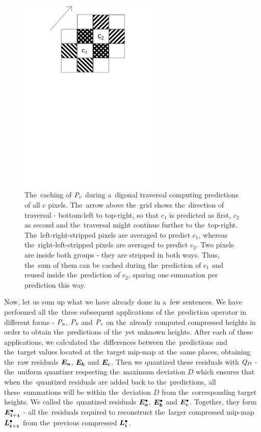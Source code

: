 \begin{figure}
	\includegraphics[trim={0 18cm 1cm 0cm}, clip, width=0.6\textwidth]{figures/ccaching.pdf}\centering
	\caption{The~caching of $\mathit{P_{c}}$ during a~digonal traversal computing predictions of all $c$ pixels. The~arrow above the~grid shows the~direction of traversal - bottom-left to top-right, so that $c_1$ is predicted as first, $c_2$ as second and the~traversal might continue further to the~top-right. The~left-right-stripped pixels are averaged to predict $c_1$, whereas the~right-left-stripped pixels are averaged to predict $c_2$. Two pixels are inside both groups - they are stripped in both ways. Thus, the~sum of them can be cached during the~prediction of $c_1$ and reused inside the~prediction of $c_2$, sparing one summation per prediction this way.}
	\label{fig:ccaching}
\end{figure}

Now, let us sum up what we have already done in a~few sentences. We have performed all the~three subsequent applications of the~prediction operator in different forms - $\mathit{P_{a}}$, $\mathit{P_{b}}$ and $\mathit{P_{c}}$ on the~already computed compressed heights in order to obtain the~predictions of the~yet unknown heights. After each of these applications, we calculated the~differences between the~predictions and the~target values located at the~target mip-map at the~same places, obtaining the~raw residuals $\objnorm{E}{a}$, $\objnorm{E}{b}$ and $\objnorm{E}{c}$. Then we quantized these residuals with $\mathit{Q_{D}}$ - the~uniform quantizer respecting the~maximum deviation $D$ which ensures that when the~quantized residuals are added back to the~predictions, all these~summations will be within the~deviation $D$ from the~corresponding target heights. We called the~quantized residuals $\objdot{E}{a}$, $\objdot{E}{b}$ and $\objdot{E}{c}$. Together, they form $\objdot{E}{i+1}$ - all the~residuals required to reconstruct the~larger compressed mip-map $\ldot{i+1}$ from the~previous compressed $\ldot{i}$.

